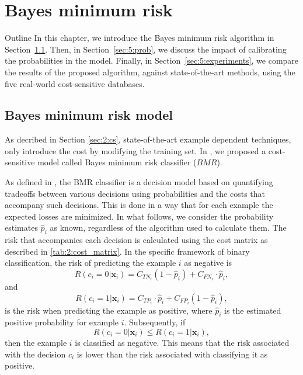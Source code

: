 \chapter{Bayes minimum risk}\label{ch:5}

\begin{remark}{Outline}
In this chapter, we introduce the Bayes minimum risk algorithm in Section~\ref{sec:5:bmr}. Then, in 
Section~\ref{sec:5:prob}, we discuss the impact of calibrating the probabilities in the model. 
Finally, in Section~\ref{sec:5:experiments}, we compare the results of the proposed 
algorithm, against state-of-the-art methods, using the five real-world cost-sensitive databases.
\end{remark}


\section{Bayes minimum risk model}
\label{sec:5:bmr}

As decribed in Section \ref{sec:2:cs}, state-of-the-art example dependent techniques, only 
introduce the cost by modifying the training set. In \citep{CorreaBahnsen2013,CorreaBahnsen2014}, 
we proposed a cost-sensitive model called Bayes minimum risk classifier ($BMR$).  

As defined in \citep{Ghosh2006}, the BMR classifier is a decision model based on
quantifying tradeoffs between various decisions using probabilities and the costs that accompany 
such decisions. This is done in a way that for each example the expected losses are minimized. In  
what follows, we consider the probability estimates $\hat p_i$ as known, regardless of the algorithm 
used to calculate them.  The risk that accompanies each decision is calculated using the cost matrix 
as described in \tablename{ \ref{tab:2:cost_matrix}}. In the specific framework of binary 
classification, the risk of predicting the example $i$ as negative is 
\begin{equation}
  R(c_i=0|\mathbf{x}_i)=C_{TN_i}(1-\hat p_i)+C_{FN_i} \cdot \hat p_i, 
\end{equation}
and
\begin{equation}
  R(c_i=1|\mathbf{x}_i)=C_{TP_i} \cdot \hat p_i + C_{FP_i}(1- \hat p_i), 
\end{equation}
is the risk when predicting the example as positive, where $\hat p_i$ is the estimated positive 
probability for example $i$. Subsequently, if 
\begin{equation}
  R(c_i=0|\mathbf{x}_i) \le R(c_i=1|\mathbf{x}_i), 
\end{equation}
then  the example $i$ is classified as negative. This means that the risk associated with the 
decision $c_i$ is lower than the risk associated with classifying it as positive. 

